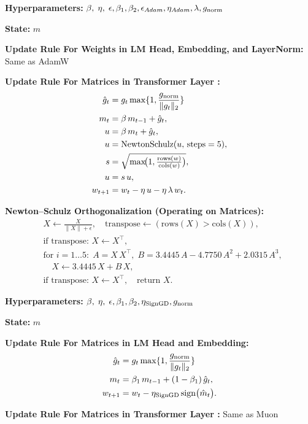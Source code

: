 \begin{algorithm}[H]
  \caption{Muon}
  \label{alg:muon}
  \begin{tcolorbox}
  \textbf{Hyperparameters:} $\beta,\;\eta,\;\epsilon, \beta_1, \beta_2, \epsilon_{Adam}, \eta_{Adam}, \lambda, g_{\mathrm{norm}}$ 

  \textbf{State:} $m$

  \textbf{Update Rule For Weights in LM Head, Embedding, and LayerNorm:} Same as AdamW

  \textbf{Update Rule For Matrices in Transformer Layer :}
  \begin{align*}
  \hat g_t &= g_t \max\{1, \frac{g_{\mathrm{norm}}}{\|g_t\|_2}\} \\
  m_t &= \beta\,m_{t-1} + \hat g_t,\\
  u   &= \beta\,m_t + \hat g_t,\\
  u   &= \mathrm{NewtonSchulz}(u,\,\text{steps}=5),\\
  s   &= \sqrt{\max\!\bigl(1,\tfrac{\mathrm{rows}(w)}{\mathrm{cols}(w)}\bigr)},\\
  u   &= s\,u,\\
  w_{t+1} &= w_t - \eta\,u - \eta\,\lambda\,w_t.
  \end{align*}

  \textbf{Newton–Schulz Orthogonalization (Operating on Matrices):}
  \begin{align*}
  &X \leftarrow \frac{X}{\lVert X\rVert + \epsilon},\quad
    \text{transpose}\leftarrow (\mathrm{rows}(X)>\mathrm{cols}(X)),\\
  &\text{if transpose: }X\leftarrow X^\top,\\
  &\text{for }i=1\ldots5:\;
    A=X\,X^\top,\;
    B=3.4445\,A - 4.7750\,A^2 + 2.0315\,A^3,\\
  &\quad X\leftarrow 3.4445\,X + B\,X,\\
  &\text{if transpose: }X\leftarrow X^\top,\quad
    \text{return }X.
  \end{align*}
  \end{tcolorbox}
\end{algorithm}

\begin{algorithm}[H]
  \caption{Scion}
  \label{alg:scion}
  \begin{tcolorbox}
  \textbf{Hyperparameters:} $\beta,\;\eta,\;\epsilon, \beta_1, \beta_2, \eta_{\mathrm{SignGD}}, g_{\mathrm{norm}}$ 

  \textbf{State:} $m$

  \textbf{Update Rule For Matrices in LM Head and Embedding:} 
  \begin{align*}
  \hat g_t &= g_t \max\{1, \frac{g_{\mathrm{norm}}}{\|g_t\|_2}\} \\
  m_t &= \beta_1\,m_{t-1} + (1-\beta_1)\,\hat g_t,\\
  w_{t+1} &= w_t - \eta_{\mathrm{SignGD}}\,\mathrm{sign}\bigl(\hat m_t\bigr).
  \end{align*}
  
  \textbf{Update Rule For Matrices in Transformer Layer :} Same as Muon

  
  \end{tcolorbox}
\end{algorithm}




